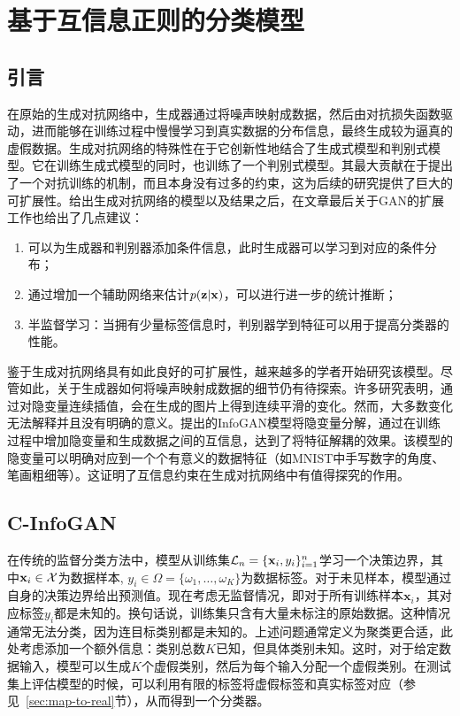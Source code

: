 \chapter{基于互信息正则的分类模型}\label{chap:model}

\section{引言}
在原始的生成对抗网络中，生成器通过将噪声映射成数据，然后由对抗损失函数驱动，进而能够在训练过程中慢慢学习到真实数据的分布信息，最终生成较为逼真的虚假数据。生成对抗网络的特殊性在于它创新性地结合了生成式模型和判别式模型。它在训练生成式模型的同时，也训练了一个判别式模型。其最大贡献在于提出了一个对抗训练的机制，而且本身没有过多的约束，这为后续的研究提供了巨大的可扩展性。\citet{goodfellow2014generative}给出生成对抗网络的模型以及结果之后，在文章最后关于GAN的扩展工作也给出了几点建议：
\begin{enumerate}
  \item 可以为生成器和判别器添加条件信息，此时生成器可以学习到对应的条件分布；
  \item 通过增加一个辅助网络来估计$p(\mathbf{z}|\mathbf{x})$，可以进行进一步的统计推断；
  \item 半监督学习：当拥有少量标签信息时，判别器学到特征可以用于提高分类器的性能。
\end{enumerate}

鉴于生成对抗网络具有如此良好的可扩展性，越来越多的学者开始研究该模型\citep{mirza2014conditional,radford2015unsupervised,chongxuan2017triple}。尽管如此，关于生成器如何将噪声映射成数据的细节仍有待探索。许多研究表明，通过对隐变量连续插值，会在生成的图片上得到连续平滑的变化\citep{radford2015unsupervised,chen2016infogan,dumoulin2016adversarially,miyato2018cgans}。然而，大多数变化无法解释并且没有明确的意义。\citet{chen2016infogan}提出的InfoGAN模型将隐变量分解，通过在训练过程中增加隐变量和生成数据之间的互信息，达到了将特征解耦的效果。该模型的隐变量可以明确对应到一个个有意义的数据特征（如MNIST中手写数字的角度、笔画粗细等）。这证明了互信息约束在生成对抗网络中有值得探究的作用。

\section{C-InfoGAN}\label{sec:c-infogan}
在传统的监督分类方法中，模型从训练集$\mathcal{L}_n = \{\mathbf{x}_i, y_i\}_{i=1}^n$学习一个决策边界，其中$\mathbf{x}_i \in \mathcal{X}$为数据样本, $y_i \in \Omega = \{\omega_1, \dots, \omega_K\}$为数据标签。对于未见样本，模型通过自身的决策边界给出预测值。现在考虑无监督情况，即对于所有训练样本$\mathbf{x}_i$，其对应标签$y_i$都是未知的。换句话说，训练集只含有大量未标注的原始数据。这种情况通常无法分类，因为连目标类别都是未知的。上述问题通常定义为聚类更合适，此处考虑添加一个额外信息：类别总数$K$已知，但具体类别未知。这时，对于给定数据输入，模型可以生成$K$个虚假类别，然后为每个输入分配一个虚假类别。在测试集上评估模型的时候，可以利用有限的标签将虚假标签和真实标签对应（参见~\ref{sec:map-to-real}节），从而得到一个分类器。

